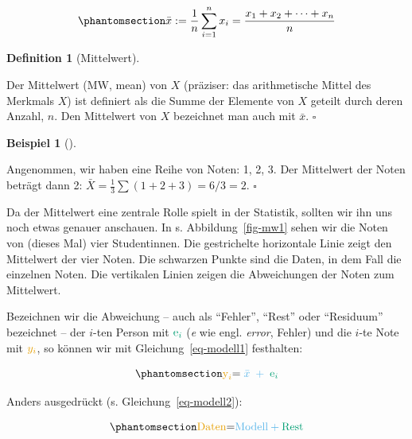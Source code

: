 \documentclass[
  letterpaper,
  twoside,
  open=any]{scrbook}
\theoremstyle{definition}
\newtheorem{definition}{Definition}[chapter]
\theoremstyle{definition}
\theoremstyle{definition}
\newtheorem{example}{Beispiel}[chapter]
\theoremstyle{remark}
\begin{document}
\begin{equation}\phantomsection\label{eq-mw-formel}{\bar {x} :=\frac{1}{n} \sum_{i=1}^{n}{x_{i}}=\frac {x_{1}+x_{2}+\dotsb +x_{n}} {n}}\end{equation}

\begin{definition}[Mittelwert]\protect\hypertarget{def-mw}{}\label{def-mw}

Der Mittelwert (MW, mean) von \(X\) (präziser: das arithmetische Mittel
des Merkmals \(X\)) ist definiert als die Summe der Elemente von \(X\)
geteilt durch deren Anzahl, \(n\). Den Mittelwert von \(X\) bezeichnet
man auch mit \(\bar {x}\). \(\square\)

\end{definition}

\begin{example}[]\protect\hypertarget{exm-mw1}{}\label{exm-mw1}

Angenommen, wir haben eine Reihe von Noten: 1, 2, 3. Der Mittelwert der
Noten beträgt dann 2: \(\bar{X} = \frac{1}{3}\sum (1+2+3) = 6/3 = 2\).
\(\square\)

\end{example}

Da der Mittelwert eine zentrale Rolle spielt in der Statistik, sollten
wir ihn uns noch etwas genauer anschauen. In s. Abbildung~\ref{fig-mw1}
sehen wir die Noten von (dieses Mal) vier Studentinnen. Die gestrichelte
horizontale Linie zeigt den Mittelwert der vier Noten. Die schwarzen
Punkte sind die Daten, in dem Fall die einzelnen Noten. Die vertikalen
Linien zeigen die Abweichungen der Noten zum Mittelwert.

Bezeichnen wir die Abweichung -- auch als \enquote{Fehler},
\enquote{Rest} oder \enquote{Residuum} bezeichnet -- der \(i\)-ten
Person mit \(\color{errorcol}{\text{e}_i}\) (\emph{e} wie engl.
\emph{error}, Fehler) und die \(i\)-te Note mit \(\color{ycol}{y_i}\),
so können wir mit Gleichung~\ref{eq-modell1} festhalten:

\begin{equation}\phantomsection\label{eq-modell1}{\color{ycol}{\text{y}_i} \color{black}{ = } \color{modelcol}{\;\bar{x}\;} + \color{errorcol}{\;\text{e}_i}}\end{equation}

Anders ausgedrückt (s. Gleichung~\ref{eq-modell2}):

\begin{equation}\phantomsection\label{eq-modell2}{\color{ycol}{\text{Daten}} \color{black}{ = } \color{modelcol}{\text{Modell}} + 
\color{errorcol}{\text{Rest}}}\end{equation}
\end{document}
